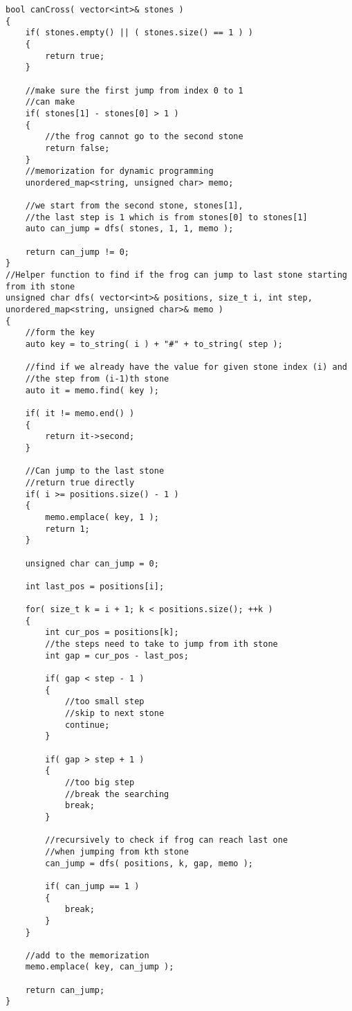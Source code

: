 \setcounter{lstlisting}{0}
\begin{lstlisting}[style=customc, caption={Dynamic Programming}]
bool canCross( vector<int>& stones )
{
    if( stones.empty() || ( stones.size() == 1 ) )
    {
        return true;
    }

    //make sure the first jump from index 0 to 1
    //can make
    if( stones[1] - stones[0] > 1 )
    {
        //the frog cannot go to the second stone
        return false;
    }
    //memorization for dynamic programming
    unordered_map<string, unsigned char> memo;

    //we start from the second stone, stones[1],
    //the last step is 1 which is from stones[0] to stones[1]
    auto can_jump = dfs( stones, 1, 1, memo );

    return can_jump != 0;
}
//Helper function to find if the frog can jump to last stone starting from ith stone
unsigned char dfs( vector<int>& positions, size_t i, int step, unordered_map<string, unsigned char>& memo )
{
    //form the key
    auto key = to_string( i ) + "#" + to_string( step );

    //find if we already have the value for given stone index (i) and
    //the step from (i-1)th stone
    auto it = memo.find( key );

    if( it != memo.end() )
    {
        return it->second;
    }

    //Can jump to the last stone
    //return true directly
    if( i >= positions.size() - 1 )
    {
        memo.emplace( key, 1 );
        return 1;
    }

    unsigned char can_jump = 0;

    int last_pos = positions[i];

    for( size_t k = i + 1; k < positions.size(); ++k )
    {
        int cur_pos = positions[k];
        //the steps need to take to jump from ith stone
        int gap = cur_pos - last_pos;

        if( gap < step - 1 )
        {
            //too small step
            //skip to next stone
            continue;
        }

        if( gap > step + 1 )
        {
            //too big step
            //break the searching
            break;
        }

        //recursively to check if frog can reach last one
        //when jumping from kth stone
        can_jump = dfs( positions, k, gap, memo );

        if( can_jump == 1 )
        {
            break;
        }
    }

    //add to the memorization
    memo.emplace( key, can_jump );

    return can_jump;
}

\end{lstlisting}